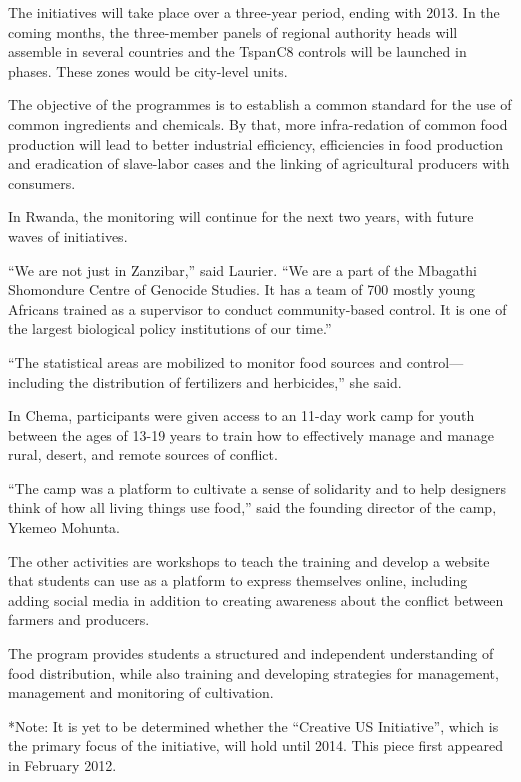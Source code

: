 \documentclass{article}
\begin{document}
The initiatives will take place over a three-year period, ending with 2013. In the coming months, the three-member panels of regional authority heads will assemble in several countries and the TspanC8 controls will be launched in phases. These zones would be city-level units.

The objective of the programmes is to establish a common standard for the use of common ingredients and chemicals. By that, more infra-redation of common food production will lead to better industrial efficiency, efficiencies in food production and eradication of slave-labor cases and the linking of agricultural producers with consumers.

In Rwanda, the monitoring will continue for the next two years, with future waves of initiatives.

“We are not just in Zanzibar,” said Laurier. “We are a part of the Mbagathi Shomondure Centre of Genocide Studies. It has a team of 700 mostly young Africans trained as a supervisor to conduct community-based control. It is one of the largest biological policy institutions of our time.”

“The statistical areas are mobilized to monitor food sources and control—including the distribution of fertilizers and herbicides,” she said.

In Chema, participants were given access to an 11-day work camp for youth between the ages of 13-19 years to train how to effectively manage and manage rural, desert, and remote sources of conflict.

“The camp was a platform to cultivate a sense of solidarity and to help designers think of how all living things use food,” said the founding director of the camp, Ykemeo Mohunta.

The other activities are workshops to teach the training and develop a website that students can use as a platform to express themselves online, including adding social media in addition to creating awareness about the conflict between farmers and producers.

The program provides students a structured and independent understanding of food distribution, while also training and developing strategies for management, management and monitoring of cultivation.

*Note: It is yet to be determined whether the “Creative US Initiative”, which is the primary focus of the initiative, will hold until 2014. This piece first appeared in February 2012.
\end{document}
